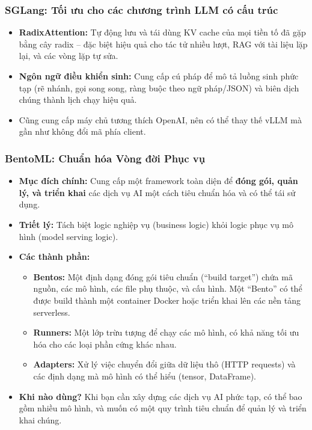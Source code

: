 \subsubsection{SGLang: Tối ưu cho các chương trình LLM có cấu trúc \newtag}
\begin{itemize}
	\item \textbf{RadixAttention:} Tự động lưu và tái dùng KV cache của mọi tiền tố đã gặp bằng cây radix \cite{zheng2024sglang} -- đặc biệt hiệu quả cho tác tử nhiều lượt, RAG với tài liệu lặp lại, và các vòng lặp tự sửa.
	\item \textbf{Ngôn ngữ điều khiển sinh:} Cung cấp cú pháp để mô tả luồng sinh phức tạp (rẽ nhánh, gọi song song, ràng buộc theo ngữ pháp/JSON) và biên dịch chúng thành lịch chạy hiệu quả.
	\item Cũng cung cấp máy chủ tương thích OpenAI, nên có thể thay thế vLLM mà gần như không đổi mã phía client.
\end{itemize}

\subsubsection{BentoML: Chuẩn hóa Vòng đời Phục vụ}
\begin{itemize}
    \item \textbf{Mục đích chính:} Cung cấp một framework toàn diện để \textbf{đóng gói, quản lý, và triển khai} các dịch vụ AI một cách tiêu chuẩn hóa và có thể tái sử dụng.
    \item \textbf{Triết lý:} Tách biệt logic nghiệp vụ (business logic) khỏi logic phục vụ mô hình (model serving logic).
    \item \textbf{Các thành phần:}
        \begin{itemize}
            \item \textbf{Bentos:} Một định dạng đóng gói tiêu chuẩn (“build target”) chứa mã nguồn, các mô hình, các file phụ thuộc, và cấu hình. Một “Bento” có thể được build thành một container Docker hoặc triển khai lên các nền tảng serverless.
            \item \textbf{Runners:} Một lớp trừu tượng để chạy các mô hình, có khả năng tối ưu hóa cho các loại phần cứng khác nhau.
            \item \textbf{Adapters:} Xử lý việc chuyển đổi giữa dữ liệu thô (HTTP requests) và các định dạng mà mô hình có thể hiểu (tensor, DataFrame).
        \end{itemize}
    \item \textbf{Khi nào dùng?} Khi bạn cần xây dựng các dịch vụ AI phức tạp, có thể bao gồm nhiều mô hình, và muốn có một quy trình tiêu chuẩn để quản lý và triển khai chúng.
\end{itemize}

